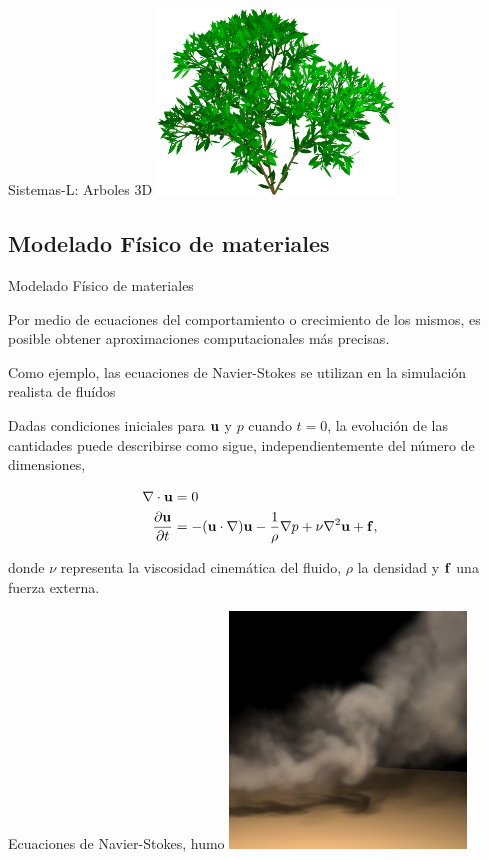 \documentclass[spanish]{beamer}
\begin{document}
\begin{frame}{Sistemas-L: Arboles 3D}
\center
\includegraphics[width=6.3cm]{../figures/3dlsystem}

\end{frame}

\subsection{Modelado Físico de materiales}

\begin{frame}{Modelado Físico de materiales}

Por medio de ecuaciones del comportamiento o crecimiento de los mismos, es posible obtener aproximaciones computacionales más precisas.

Como ejemplo, las ecuaciones de Navier-Stokes se utilizan en la simulación realista de fluídos

Dadas condiciones iniciales para $\bold{u}$ y $p$ cuando $t = 0$, la evolución de las cantidades puede describirse como sigue, independientemente del número de dimensiones,

\begin{align*}
\nabla \cdot \bold{u} &= 0\\
\frac{\partial \bold{u} }{\partial t} &= - (\bold{u} \cdot \nabla) \bold{u} - \frac{1}{\rho} \nabla p + \nu \nabla^{2} \bold{u} + \bold{f},
\end{align*}

\noindent donde $\nu$ representa la viscosidad cinemática del fluido, $\rho$ la densidad y $\bold{f}$ una fuerza externa.

\end{frame}

\begin{frame}{Ecuaciones de Navier-Stokes, humo}
\center
\includegraphics[width=6.3cm]{../figures/smoke}

\end{frame}
\end{document}
